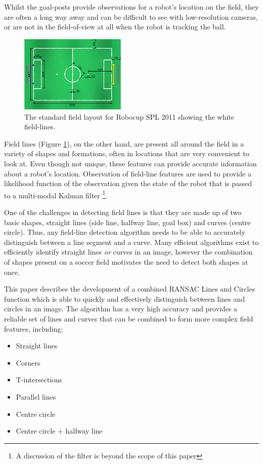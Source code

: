 \documentclass[runningheads,a4paper]{llncs}
\begin{document}
Whilst the goal-posts provide observations for a robot's location on the field, they are often a long way away and can be difficult to see with low-resolution cameras, or are not in the field-of-view at all when the robot is tracking the ball. 

\begin{figure}[H]
\centering
\includegraphics[width=0.45\textwidth]{Pictures/field.png}
\caption{The standard field layout for Robocup SPL 2011 showing the white field-lines.}\label{fig:field}
\end{figure}

Field lines (Figure \ref{fig:field}), on the other hand, are present all around the field in a variety of shapes and formations, often in locations that are very convenient to look at. Even though not unique, these features can provide accurate information about a robot's location. Observation of field-line features are used to provide a likelihood function of the observation given the state of the robot that is passed to a multi-modal Kalman filter \cite{claridge}\footnote{A discussion of the filter is beyond the scope of this paper}. 

One of the challenges in detecting field lines is that they are made up of two basic shapes, straight lines (side line, halfway line, goal box) and curves (centre circle). Thus, any field-line detection algorithm needs to be able to accurately distinguish between a line segment and a curve. Many efficient algorithms exist to efficiently identify straight lines \emph{or} curves in an image, however the combination of shapes present on a soccer field motivates the need to detect both shapes at once.

This paper describes the development of a combined RANSAC Lines and Circles function which is able to quickly and effectively distinguish between lines and circles in an image. The algorithm has a very high accuracy and provides a reliable set of lines and curves that can be combined to form more complex field features, including:

\begin{itemize}
   \item{Straight lines}
   \item{Corners}
   \item{T-intersections}
   \item{Parallel lines}
   \item{Centre circle}
   \item{Centre circle + halfway line}
\end{itemize}
\end{document}
